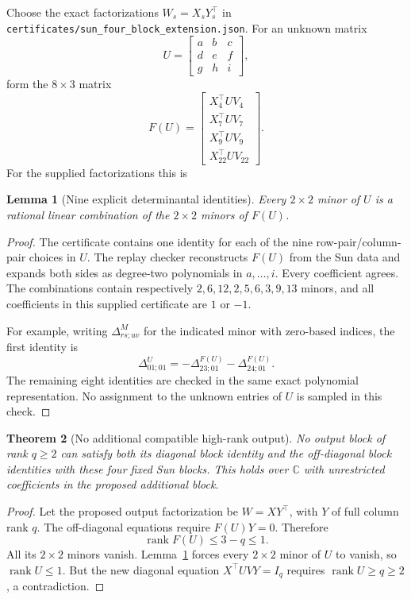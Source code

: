 \documentclass[11pt]{article}
\newtheorem{theorem}{Theorem}[section]
\newtheorem{lemma}[theorem]{Lemma}
\theoremstyle{definition}\newtheorem{definition}[theorem]{Definition}
\newcommand{\C}{\mathbb C}\newcommand{\Q}{\mathbb Q}
\newcommand{\rank}{\operatorname{rank}}
\newcommand{\file}[1]{\nolinkurl{#1}}
\newcommand{\bb}[1]{\begin{bmatrix}#1\end{bmatrix}}
\begin{document}
Choose the exact factorizations $W_s=X_sY_s^\top$ in \file{certificates/sun_four_block_extension.json}. For an unknown matrix
\[
U=\bb{a&b&c\\d&e&f\\g&h&i},
\]
form the $8\times3$ matrix
\begin{equation}\label{eq:sunF}
F(U)=\begin{bmatrix}X_4^\top UV_4\\X_7^\top UV_7\\X_9^\top UV_9\\X_{22}^\top UV_{22}\end{bmatrix}.
\end{equation}
For the supplied factorizations this is


\begin{lemma}[Nine explicit determinantal identities]\label{lem:sunminors}
Every $2\times2$ minor of $U$ is a rational linear combination of the $2\times2$ minors of $F(U)$.
\end{lemma}
\begin{proof}
The certificate contains one identity for each of the nine row-pair/column-pair choices in $U$. The replay checker reconstructs $F(U)$ from the Sun data and expands both sides as degree-two polynomials in $a,\ldots,i$. Every coefficient agrees. The combinations contain respectively $2,6,12,2,5,6,3,9,13$ minors, and all coefficients in this supplied certificate are $1$ or $-1$.

For example, writing $\Delta^M_{rs;uv}$ for the indicated minor with zero-based indices, the first identity is
\[
\Delta^U_{01;01}=-\Delta^{F(U)}_{23;01}-\Delta^{F(U)}_{24;01}.
\]
The remaining eight identities are checked in the same exact polynomial representation. No assignment to the unknown entries of $U$ is sampled in this check.
\end{proof}

\begin{theorem}[No additional compatible high-rank output]\label{thm:sun}
No output block of rank $q\ge2$ can satisfy both its diagonal block identity and the off-diagonal block identities with these four fixed Sun blocks. This holds over $\C$ with unrestricted coefficients in the proposed additional block.
\end{theorem}
\begin{proof}
Let the proposed output factorization be $W=XY^\top$, with $Y$ of full column rank $q$. The off-diagonal equations require $F(U)Y=0$. Therefore
\[
\rank F(U)\le3-q\le1.
\]
All its $2\times2$ minors vanish. Lemma~\ref{lem:sunminors} forces every $2\times2$ minor of $U$ to vanish, so $\rank U\le1$. But the new diagonal equation $X^\top UVY=I_q$ requires $\rank U\ge q\ge2$, a contradiction.
\end{proof}
\end{document}
